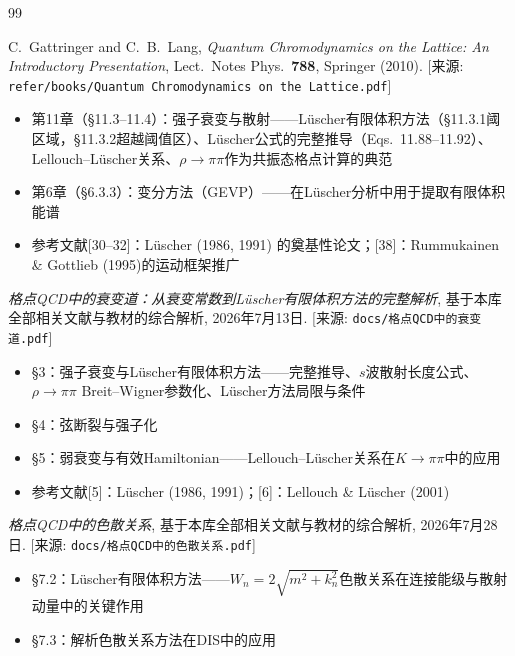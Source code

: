 \documentclass[12pt,a4paper]{ctexart}
\theoremstyle{definition}
\begin{document}

\begin{thebibliography}{99}

C.~Gattringer and C.~B.~Lang,
\textit{Quantum Chromodynamics on the Lattice: An Introductory Presentation},
Lect.\ Notes Phys.\ \textbf{788}, Springer (2010).
[来源: \texttt{refer/books/Quantum Chromodynamics on the Lattice.pdf}]
\begin{itemize}
    \item 第11章（§11.3--11.4）：强子衰变与散射——L\"uscher有限体积方法（§11.3.1阈区域，§11.3.2超越阈值区）、L\"uscher公式的完整推导（Eqs.~11.88--11.92）、Lellouch--L\"uscher关系、$\rho\to\pi\pi$作为共振态格点计算的典范
    \item 第6章（§6.3.3）：变分方法（GEVP）——在L\"uscher分析中用于提取有限体积能谱
    \item 参考文献[30--32]：L\"uscher (1986, 1991) 的奠基性论文；[38]：Rummukainen \& Gottlieb (1995)的运动框架推广
\end{itemize}

\textit{格点QCD中的衰变道：从衰变常数到L\"uscher有限体积方法的完整解析},
基于本库全部相关文献与教材的综合解析, 2026年7月13日.
[来源: \texttt{docs/格点QCD中的衰变道.pdf}]
\begin{itemize}
    \item §3：强子衰变与L\"uscher有限体积方法——完整推导、$s$波散射长度公式、$\rho\to\pi\pi$ Breit--Wigner参数化、L\"uscher方法局限与条件
    \item §4：弦断裂与强子化
    \item §5：弱衰变与有效Hamiltonian——Lellouch--L\"uscher关系在$K\to\pi\pi$中的应用
    \item 参考文献[5]：L\"uscher (1986, 1991)；[6]：Lellouch \& L\"uscher (2001)
\end{itemize}

\textit{格点QCD中的色散关系},
基于本库全部相关文献与教材的综合解析, 2026年7月28日.
[来源: \texttt{docs/格点QCD中的色散关系.pdf}]
\begin{itemize}
    \item §7.2：L\"uscher有限体积方法——$W_n = 2\sqrt{m^2 + k_n^2}$色散关系在连接能级与散射动量中的关键作用
    \item §7.3：解析色散关系方法在DIS中的应用
\end{itemize}


\end{thebibliography}
\end{document}
